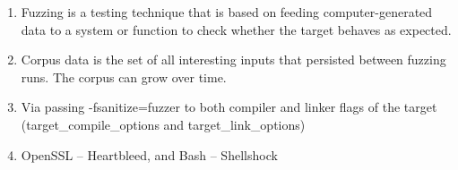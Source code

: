 

\begin{enumerate}
\item 
Fuzzing is a testing technique that is based on feeding computer-generated data to a system or function to check whether the target behaves as expected.

\item
Corpus data is the set of all interesting inputs that persisted between fuzzing runs. The corpus can grow over time.

\item 
Via passing -fsanitize=fuzzer to both compiler and linker flags of the target (target\_compile\_options and target\_link\_options)

\item 
OpenSSL – Heartbleed, and Bash – Shellshock
\end{enumerate}